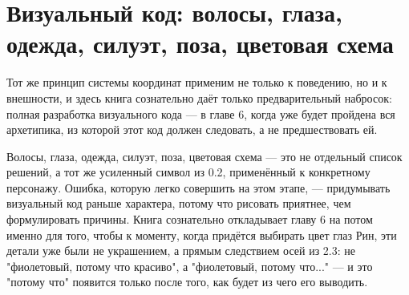 \section{Визуальный код: волосы, глаза, одежда, силуэт, поза, цветовая схема}

Тот же принцип системы координат применим не только к поведению, но и к внешности, и здесь книга сознательно даёт только предварительный набросок: полная разработка визуального кода — в главе 6, когда уже будет пройдена вся архетипика, из которой этот код должен следовать, а не предшествовать ей.

Волосы, глаза, одежда, силуэт, поза, цветовая схема — это не отдельный список решений, а тот же усиленный символ из 0.2, применённый к конкретному персонажу. Ошибка, которую легко совершить на этом этапе, — придумывать визуальный код раньше характера, потому что рисовать приятнее, чем формулировать причины. Книга сознательно откладывает главу 6 на потом именно для того, чтобы к моменту, когда придётся выбирать цвет глаз Рин, эти детали уже были не украшением, а прямым следствием осей из 2.3: не "фиолетовый, потому что красиво", а "фиолетовый, потому что..." — и это "потому что" появится только после того, как будет из чего его выводить.
